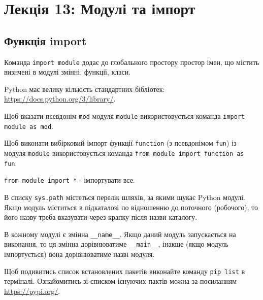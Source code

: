 \section{Лекція 13: Модулі та імпорт}
 
 \subsection{Функція import} 
\begin{frame}
Команда \texttt{import module} додає до глобального простору простор імен, що містить визнчені в модулі змінні, функції, класи. 

Python має велику кількість стандартних бібліотек: \href{https://docs.python.org/3/library/}{https://docs.python.org/3/library/}.

Щоб вказати псевдонім \texttt{mod} модуля \texttt{module} використовується команда \texttt{import module as mod}.

Щоб виконати вибірковий імпорт функції \texttt{function} (з псевдонімом \texttt{fun}) із модуля \texttt{module} використовується команда \texttt{from module import function as fun}.

\texttt{from module import *} - імпортувати все.

\end{frame}

\begin{frame}
В списку \texttt{sys.path} містеться перелік шляхів, за якими шукає Python модулі. Якщо модуль міститься в підкаталозі по відношенню до поточного (робочого), то його назву треба вказувати через крапку після назви каталогу. 

В кожному модулі є змінна \texttt{\_\_name\_\_}. Якщо даний модуль запускається на виконання, то ця змінна дорівнюватиме \texttt{\_\_main\_\_}, інакше (якщо модуль імпортується) вона дорівнюватиме назві модуля.

Щоб подивитись список встановлених пакетів виконайте команду \texttt{pip list} в терміналі. Ознайомитись зі списком існуючих пактів можна за посиланням \href{https://pypi.org/}{https://pypi.org/}.
\end{frame}


